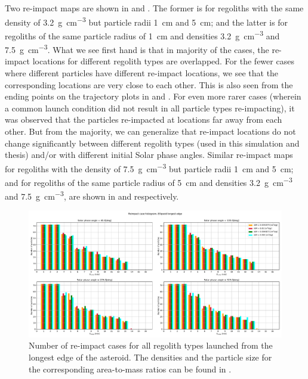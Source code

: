 Two re-impact maps are shown in  and . The former is for regoliths with the same density of \SI{3.2}{\gram\per\centi\metre\cubed} but particle radii \SI{1}{\centi\metre} and \SI{5}{\centi\metre}; and the latter is for regoliths of the same particle radius of \SI{1}{\centi\metre} and densities \SI{3.2}{\gram\per\centi\metre\cubed} and \SI{7.5}{\gram\per\centi\metre\cubed}. What we see first hand is that in majority of the cases, the re-impact locations for different regolith types are overlapped. For the fewer cases where different particles have different re-impact locations, we see that the corresponding locations are very close to each other. This is also seen from the ending points on the trajectory plots in  and . For even more rarer cases (wherein a common launch condition did not result in all particle types re-impacting), it was observed that the particles re-impacted at locations far away from each other. But from the majority, we can generalize that re-impact locations do not change significantly between different regolith types (used in this simulation and thesis) and/or with different initial Solar phase angles. Similar re-impact maps for regoliths with the density of \SI{7.5}{\gram\per\centi\metre\cubed} but particle radii \SI{1}{\centi\metre} and \SI{5}{\centi\metre}; and for regoliths of the same particle radius of \SI{5}{\centi\metre} and densities \SI{3.2}{\gram\per\centi\metre\cubed} and \SI{7.5}{\gram\per\centi\metre\cubed}, are shown in  and  respectively.
\begin{figure}[htb]
\centering
\captionsetup{justification=centering}
\includegraphics[angle=90, width=\textwidth, height=\textheight, keepaspectratio=true]{longest_edge_perturbations/multiple_regolith_types/allPhases_reimpactCases.pdf}
\caption{Number of re-impact cases for all regolith types launched from the longest edge of the asteroid. The densities and the particle size for the corresponding area-to-mass ratios can be found in .}
\label{fig:longestEdge_allParticles_reimpact_hist}
\end{figure}
